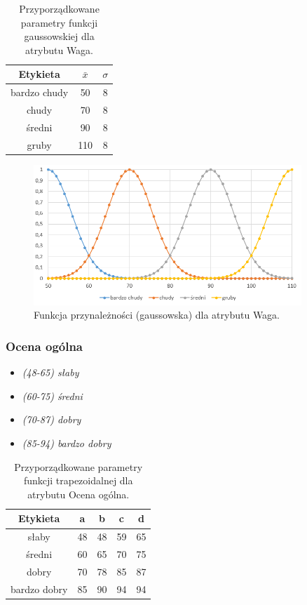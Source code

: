 \documentclass{classrep}
\begin{document}
	\begin{table}[h!]
		\centering
		\begin{tabular} {c c c}
			\hline
			\textbf{Etykieta} & \textbf{$\bar{x}$} & \textbf{$\sigma$} \\ [0.5ex] 
			\hline	
			\hline 
			bardzo chudy & 50 & 8  \\
			chudy & 70 & 8  \\
			średni & 90 & 8  \\
			gruby & 110 & 8  \\
			\hline
		\end{tabular}
		\caption{Przyporządkowane parametry funkcji gaussowskiej dla atrybutu  Waga. }
		\label{tabelaWaga}
	\end{table}
	
	\begin{figure}[h!]
		\centering
		\includegraphics[width=0.9\textwidth]{zmienne/3.png}
		\caption{Funkcja przynależności (gaussowska) dla atrybutu Waga.}
		\label{wykresWaga}
	\end{figure}
	
	\newpage
	\subsubsection{Ocena ogólna}
	\begin{itemize}
		\item \textsl{(48-65) słaby}
		\item \textsl{(60-75) średni}
		\item \textsl{(70-87) dobry}
		\item \textsl{(85-94) bardzo dobry}
	\end{itemize}
	
	\begin{table}[h!]
		\centering
		\begin{tabular} {c c c c c}
			\hline
			\textbf{Etykieta} & \textbf{a} & \textbf{b} & \textbf{c} & \textbf{d} \\ [0.5ex] 
			\hline	
			\hline 
			słaby & 48 & 48 & 59 & 65  \\
			średni & 60 & 65 & 70 & 75  \\
			dobry & 70 & 78 & 85 & 87  \\
			bardzo dobry & 85 & 90 & 94 & 94  \\
			\hline
		\end{tabular}
		\caption{Przyporządkowane parametry funkcji trapezoidalnej dla atrybutu  Ocena ogólna. }
		\label{tabelaOverall}
	\end{table}
	
\end{document}
